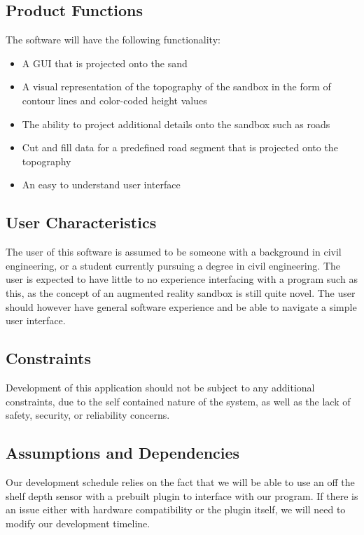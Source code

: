\documentclass[onecolumn, draftclsnofoot,10pt, compsoc]{IEEEtran}
\begin{document}
\subsection{Product Functions}
The software will have the following functionality:
\begin{itemize}
\item A GUI that is projected onto the sand
\item A visual representation of the topography of the sandbox in the form of contour lines and color-coded height values
\item The ability to project additional details onto the sandbox such as roads
\item Cut and fill data for a predefined road segment that is projected onto the topography
\item An easy to understand user interface
\end{itemize}

\subsection{User Characteristics}
The user of this software is assumed to be someone with a background in civil engineering, or a student currently pursuing a degree in civil engineering.
The user is expected to have little to no experience interfacing with a program such as this, as the concept of an augmented reality sandbox is still quite novel.
The user should however have general software experience and be able to navigate a simple user interface.

\subsection{Constraints}
Development of this application should not be subject to any additional constraints, due to the self contained nature of the system, as well as the lack of safety, security, or reliability concerns.

\subsection{Assumptions and Dependencies}
Our development schedule relies on the fact that we will be able to use an off the shelf depth sensor with a prebuilt plugin to interface with our program. If there is an issue either with hardware compatibility or the plugin itself, we will need to modify our development timeline.
\end{document}
